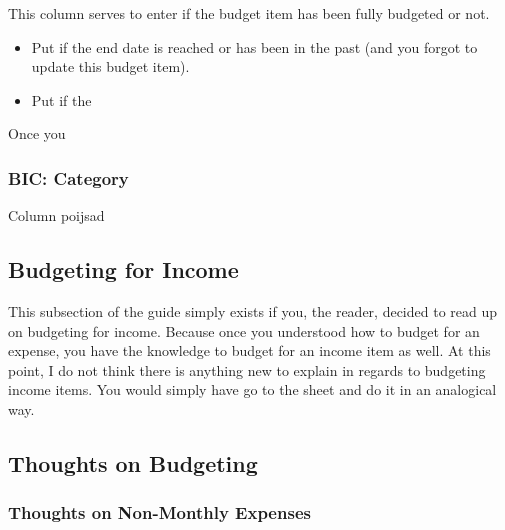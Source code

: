 This column serves to enter if the budget item has been fully budgeted or not.
\begin{itemize}
	\item Put  if the end date is reached or has been in the past (and you forgot to update this budget item).
	\item Put  if the 
\end{itemize}

Once you 

\subsubsection{BIC: Category}
\label{subsubsec:budgeting-item-column-category}

Column  poijsad

\subsection{Budgeting for Income}
\label{subsec:budgeting-income}

This subsection of the guide simply exists if you, the reader, decided to read up on budgeting for income.
Because once you understood how to budget for an expense, you have the knowledge to budget for an income item as well.
At this point, I do not think there is anything new to explain in regards to budgeting income items.
You would simply have go to the sheet  and do it in an analogical way.

\subsection{Thoughts on Budgeting}
\label{subsubsec:thoughts-on-budgeting}

\subsubsection{Thoughts on Non-Monthly Expenses}
\label{subsubsec:thoughts-non-monthly-expenses}

